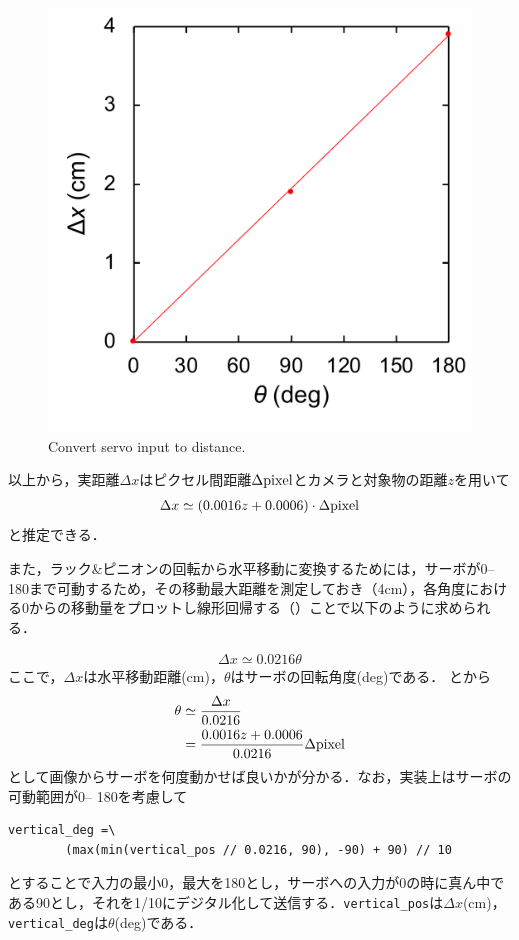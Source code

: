 \begin{figure}[H]
    \centering
    \includegraphics[width=0.5\linewidth]{figure/chapter4/servo2distance}
    \caption{Convert servo input to distance.}
    \label{fig:servo2dist}
\end{figure}

以上から，実距離$\Delta x$はピクセル間距離$\Delta \rm{pixel}$とカメラと対象物の距離$z$を用いて
\begin{align}\label{eq:ピクセル間距離}
    \Delta x \simeq (0.0016z + 0.0006) \cdot \Delta \rm{pixel}
\end{align}
と推定できる．

また，ラック\&ピニオンの回転から水平移動に変換するためには，サーボが0\deg -- 180\deg まで可動するため，その移動最大距離を測定しておき（4cm），各角度における0\deg からの移動量をプロットし線形回帰する（）ことで以下のように求められる．

\begin{align}\label{eq:スライド角度}
    \Delta x \simeq 0.0216 \theta
\end{align}
ここで，$\Delta x$は水平移動距離(cm)，$\theta$はサーボの回転角度(deg)である．
とから
\begin{align}
    \theta & \simeq \dfrac{\Delta x}{0.0216} \\
           & = \dfrac{0.0016z + 0.0006}{0.0216} \Delta \rm{pixel} \\
\end{align}
として画像からサーボを何度動かせば良いかが分かる．なお，実装上はサーボの可動範囲が0\deg -- 180\deg を考慮して
\begin{lstlisting}[label=code:servo]
    vertical_deg =\
        (max(min(vertical_pos // 0.0216, 90), -90) + 90) // 10
\end{lstlisting}
とすることで入力の最小0，最大を180とし，サーボへの入力が0の時に真ん中である90\deg とし，それを1/10にデジタル化して送信する．\texttt{vertical\_pos}は$\Delta x$(cm)，\texttt{vertical\_deg}は$\theta$(deg)である．


